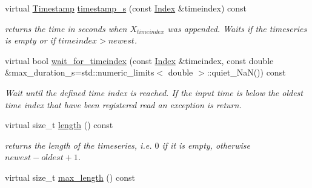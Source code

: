 \begin{DoxyCompactItemize}
\mbox{\label{classreal__time__tools_1_1ThreadsafeTimeseries_ad0d658592471f37c5dfca22765d1b6e7}} 
virtual \hyperlink{classreal__time__tools_1_1ThreadsafeTimeseries_a41e36f99889a580ce56491e573fa77b0}{Timestamp} \hyperlink{classreal__time__tools_1_1ThreadsafeTimeseries_ad0d658592471f37c5dfca22765d1b6e7}{timestamp\+\_\+s} (const \hyperlink{classreal__time__tools_1_1ThreadsafeTimeseries_a9364696c534468d7ad927883b16ca981}{Index} \&timeindex) const
\begin{DoxyCompactList}\small\item\em returns the time in seconds when $ X_{timeindex} $ was appended. Waits if the timeseries is empty or if $timeindex > newest $. \end{DoxyCompactList}\item 
\mbox{\label{classreal__time__tools_1_1ThreadsafeTimeseries_ae7e9f19aae9a415788adca06e20d84b3}} 
virtual bool \hyperlink{classreal__time__tools_1_1ThreadsafeTimeseries_ae7e9f19aae9a415788adca06e20d84b3}{wait\+\_\+for\+\_\+timeindex} (const \hyperlink{classreal__time__tools_1_1ThreadsafeTimeseries_a9364696c534468d7ad927883b16ca981}{Index} \&timeindex, const double \&max\+\_\+duration\+\_\+s=std\+::numeric\+\_\+limits$<$ double $>$\+::quiet\+\_\+\+NaN()) const
\begin{DoxyCompactList}\small\item\em Wait until the defined time index is reached. If the input time is below the oldest time index that have been registered read an exception is return. \end{DoxyCompactList}\item 
\mbox{\label{classreal__time__tools_1_1ThreadsafeTimeseries_a5bc74b365f6fab7b9131caf5bb2c15dd}} 
virtual size\+\_\+t \hyperlink{classreal__time__tools_1_1ThreadsafeTimeseries_a5bc74b365f6fab7b9131caf5bb2c15dd}{length} () const
\begin{DoxyCompactList}\small\item\em returns the length of the timeseries, i.\+e. $0$ if it is empty, otherwise $newest - oldest +1 $. \end{DoxyCompactList}\item 
virtual size\+\_\+t \hyperlink{classreal__time__tools_1_1ThreadsafeTimeseries_a14a749296f8728f9fa344e0bc63d6926}{max\+\_\+length} () const

\end{DoxyCompactItemize}
